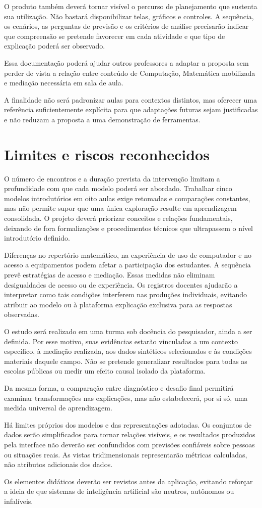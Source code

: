 O produto também deverá tornar visível o percurso de planejamento que sustenta sua utilização. Não bastará disponibilizar telas, gráficos e controles. A sequência, os cenários, as perguntas de previsão e os critérios de análise precisarão indicar que compreensão se pretende favorecer em cada atividade e que tipo de explicação poderá ser observado.

Essa documentação poderá ajudar outros professores a adaptar a proposta sem perder de vista a relação entre conteúdo de Computação, Matemática mobilizada e mediação necessária em sala de aula.

A finalidade não será padronizar aulas para contextos distintos, mas oferecer uma referência suficientemente explícita para que adaptações futuras sejam justificadas e não reduzam a proposta a uma demonstração de ferramentas.

\section{Limites e riscos reconhecidos}

O número de encontros e a duração prevista da intervenção limitam a profundidade com que cada modelo poderá ser abordado. Trabalhar cinco modelos introdutórios em oito aulas exige retomadas e comparações constantes, mas não permite supor que uma única exploração resulte em aprendizagem consolidada. O projeto deverá priorizar conceitos e relações fundamentais, deixando de fora formalizações e procedimentos técnicos que ultrapassem o nível introdutório definido.

Diferenças no repertório matemático, na experiência de uso de computador e no acesso a equipamentos podem afetar a participação dos estudantes. A sequência prevê estratégias de acesso e mediação. Essas medidas não eliminam desigualdades de acesso ou de experiência. Os registros docentes ajudarão a interpretar como tais condições interferem nas produções individuais, evitando atribuir ao modelo ou à plataforma explicação exclusiva para as respostas observadas.

O estudo será realizado em uma turma sob docência do pesquisador, ainda a ser definida. Por esse motivo, suas evidências estarão vinculadas a um contexto específico, à mediação realizada, aos dados sintéticos selecionados e às condições materiais daquele campo. Não se pretende generalizar resultados para todas as escolas públicas ou medir um efeito causal isolado da plataforma.

Da mesma forma, a comparação entre diagnóstico e desafio final permitirá examinar transformações nas explicações, mas não estabelecerá, por si só, uma medida universal de aprendizagem.

Há limites próprios dos modelos e das representações adotadas. Os conjuntos de dados serão simplificados para tornar relações visíveis, e os resultados produzidos pela interface não deverão ser confundidos com previsões confiáveis sobre pessoas ou situações reais. As vistas tridimensionais representarão métricas calculadas, não atributos adicionais dos dados.

Os elementos didáticos deverão ser revistos antes da aplicação, evitando reforçar a ideia de que sistemas de inteligência artificial são neutros, autônomos ou infalíveis.
